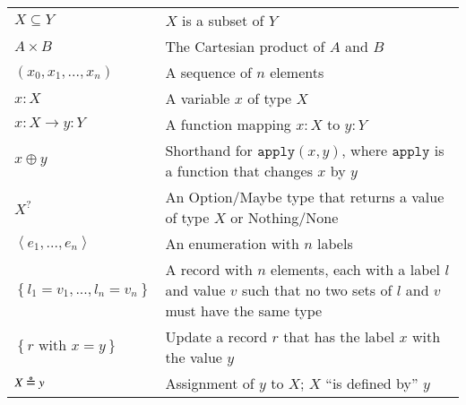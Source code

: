 \begin{center}
\begin{tabular}{C{0.2\textwidth} m{0.7\textwidth}}
        $X \subseteq Y $ & $X$ is a subset of $Y$ \\

        $A \times B$ & The Cartesian product of $A$ and $B$ \\

        $\left(x_0, x_1, ..., x_n\right)$ & A sequence of
        $n$ elements \\

        $x : X$ & A variable $x$ of type $X$ \\

        $x : X \rightarrow y : Y$ & A function mapping $x :
        X$ to $y : Y$ \\

        $x \oplus y$ & Shorthand for $\mathtt{apply}(x,
        y)$, where $\mathtt{apply}$ is a function that changes $x$ by $y$ \\

        $X^?$ & An Option/Maybe type that returns a value
        of type $X$ or Nothing/None \\

        $\left< e_1, ..., e_n \right>$ & An enumeration with $n$ labels \\

        $\left\{ l_1 = v_1, ..., l_n = v_n \right\}$ & A
        record with $n$ elements, each with a label $l$ and value $v$ such that
        no two sets of $l$ and $v$ must have the same type \\

        $\left\{ r \text{ with } x = y \right\}$ & Update a record $r$ that has
        the label $x$ with the value $y$ \\

        $X \defEq y $ & Assignment of $y$ to $X$; $X$
        ``is defined by'' $y$\\

        \bottomrule
    \end{tabular}

\end{center}